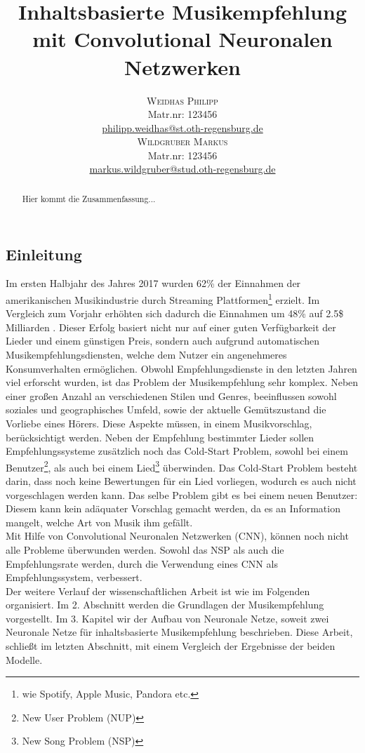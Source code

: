 \documentclass[twosided,a4,10pt]{article}
\title{\vspace{-5mm}%
	\fontsize{20pt}{10pt}\selectfont
	\textbf{Inhaltsbasierte Musikempfehlung mit Convolutional Neuronalen Netzwerken}
}
\author{
	\large\begin{minipage}[t]{0.5\linewidth}
		\begin{center}
			\textsc{Weidhas Philipp}\\[2mm]
			\normalsize	Matr.nr: 123456\\
			\normalsize
			\href{mailto:philipp.weidhas@st.oth-regensburg.de}
			{philipp.weidhas@st.oth-regensburg.de}
		\end{center}
	\end{minipage}
	\begin{minipage}[t]{0.5\linewidth}
		\begin{center}
			\textsc{Wildgruber Markus}\\[2mm]
			\normalsize	Matr.nr: 123456\\
			\normalsize
			\href{mailto:markus.wildgruber@stud.oth-regensburg.de}
			{markus.wildgruber@stud.oth-regensburg.de}
		\end{center}
	\end{minipage}
}
\begin{document}
	\maketitle
	\thispagestyle{fancy}
	\begin{multicols}{2}
		\begin{abstract}
			\noindent Hier kommt die Zusammenfassung...
		\end{abstract}
		\section{Einleitung}
		Im ersten Halbjahr des Jahres 2017 wurden 62\% der Einnahmen der amerikanischen Musikindustrie durch Streaming Plattformen\footnote[1]{wie Spotify, Apple Music, Pandora etc.} erzielt. Im Vergleich zum Vorjahr erhöhten sich dadurch die Einnahmen um 48\% auf 2.5\$ Milliarden \cite{friedlander}. Dieser Erfolg basiert nicht nur auf einer guten Verfügbarkeit der Lieder und einem günstigen Preis, sondern auch aufgrund automatischen Musikempfehlungsdiensten, welche dem Nutzer ein angenehmeres Konsumverhalten ermöglichen.\newline
		Obwohl Empfehlungsdienste in den letzten Jahren viel erforscht wurden, ist das Problem der Musikempfehlung sehr komplex. Neben einer großen Anzahl an verschiedenen Stilen und Genres, beeinflussen sowohl soziales und geographisches Umfeld, sowie der aktuelle Gemütszustand die Vorliebe eines Hörers. Diese Aspekte müssen, in einem Musikvorschlag, berücksichtigt werden. \cite{oord}\newline
		Neben der Empfehlung bestimmter Lieder sollen Empfehlungssysteme zusätzlich noch das Cold-Start Problem, sowohl bei einem Benutzer\footnote[2]{New User Problem (NUP)}, als auch bei einem Lied\footnote[3]{New Song Problem (NSP)} überwinden. Das Cold-Start Problem besteht darin, dass noch keine Bewertungen für ein Lied vorliegen, wodurch es auch nicht vorgeschlagen werden kann. Das selbe Problem gibt es bei einem neuen Benutzer: Diesem kann kein adäquater Vorschlag gemacht werden, da es an Information mangelt, welche Art von Musik ihm gefällt. \cite{celma}\\
		Mit Hilfe von Convolutional Neuronalen Netzwerken (CNN), können noch nicht alle Probleme überwunden werden. Sowohl das NSP als auch die Empfehlungsrate werden, durch die Verwendung eines CNN als Empfehlungssystem, verbessert.\newline\\
		Der weitere Verlauf der wissenschaftlichen Arbeit ist wie im Folgenden organisiert. Im 2. Abschnitt werden die Grundlagen der Musikempfehlung vorgestellt. Im 3. Kapitel wir der Aufbau von Neuronale Netze, soweit zwei Neuronale Netze für inhaltsbasierte Musikempfehlung beschrieben. Diese Arbeit, schließt im letzten Abschnitt, mit einem Vergleich der Ergebnisse der beiden Modelle.


\end{multicols}
\end{document}
